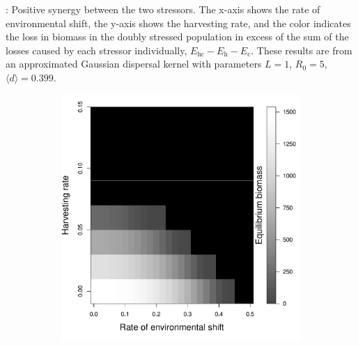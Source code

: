 \documentclass[12pt,english]{article}
\begin{document}
\pagebreak

: Positive synergy between the two stressors.  The x-axis shows the rate of environmental shift, the y-axis shows the harvesting rate, and the color indicates the loss in biomass in the doubly stressed population in excess of the sum of the losses caused by each stressor individually, $E_\text{hc}-E_\text{h}-E_\text{c}$.  These results are from an approximated Gaussian dispersal kernel with parameters $L=1$, $R_0=5$, $\langle d \rangle = 0.399$.

\pagebreak

\begin{figure}[htbp]

\begin{subfigure}{.33\textwidth}
\subcaption{}
\includegraphics[width=\textwidth]{plots/eqbiomass_sim.pdf}
\label{nomang}
\end{subfigure}
\begin{subfigure}{.33\textwidth}
\subcaption{}

\end{subfigure}
\end{figure}
\end{document}
